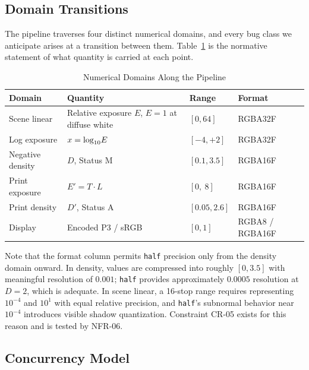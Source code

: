 \subsection{Domain Transitions}

The pipeline traverses four distinct numerical domains, and every bug class we
anticipate arises at a transition between them. Table~\ref{tab:domains} is the
normative statement of what quantity is carried at each point.

\begin{table}[htbp]
\caption{Numerical Domains Along the Pipeline}
\label{tab:domains}
\begin{center}
\renewcommand{\arraystretch}{1.15}
\begin{tabularx}{\columnwidth}{@{}l>{\raggedright\arraybackslash}Xll@{}}
\toprule
\textbf{Domain} & \textbf{Quantity} & \textbf{Range} & \textbf{Format} \\
\midrule
Scene linear & Relative exposure $E$, $E=1$ at diffuse white & $[0, 64]$ & RGBA32F \\
Log exposure & $x = \log_{10}\!E$ & $[-4, +2]$ & RGBA32F \\
Negative density & $D$, Status M & $[0.1, 3.5]$ & RGBA16F \\
Print exposure & $E' = T \cdot L$ & $[0,\ 8]$ & RGBA16F \\
Print density & $D'$, Status A & $[0.05, 2.6]$ & RGBA16F \\
Display & Encoded P3 / sRGB & $[0,1]$ & RGBA8 / RGBA16F \\
\bottomrule
\end{tabularx}
\end{center}
\end{table}

Note that the format column permits \texttt{half} precision only from the
density domain onward. In density, values are compressed into roughly
$[0, 3.5]$ with meaningful resolution of $0.001$; \texttt{half} provides
approximately $0.0005$ resolution at $D=2$, which is adequate. In scene linear,
a 16-stop range requires representing $10^{-4}$ and $10^{1}$ with equal relative
precision, and \texttt{half}'s subnormal behavior near $10^{-4}$ introduces
visible shadow quantization. Constraint CR-05 exists for this reason and is
tested by NFR-06.

\subsection{Concurrency Model}


